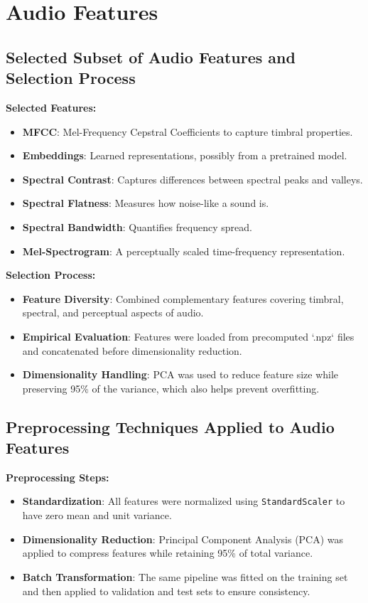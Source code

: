\documentclass{article}
\begin{document}

\section{Audio Features}

\subsection{Selected Subset of Audio Features and Selection Process}

\textbf{Selected Features:}
\begin{itemize}
    \item \textbf{MFCC}: Mel-Frequency Cepstral Coefficients to capture timbral properties.
    \item \textbf{Embeddings}: Learned representations, possibly from a pretrained model.
    \item \textbf{Spectral Contrast}: Captures differences between spectral peaks and valleys.
    \item \textbf{Spectral Flatness}: Measures how noise-like a sound is.
    \item \textbf{Spectral Bandwidth}: Quantifies frequency spread.
    \item \textbf{Mel-Spectrogram}: A perceptually scaled time-frequency representation.
\end{itemize}

\textbf{Selection Process:}
\begin{itemize}
    \item \textbf{Feature Diversity}: Combined complementary features covering timbral, spectral, and perceptual aspects of audio.
    \item \textbf{Empirical Evaluation}: Features were loaded from precomputed `.npz` files and concatenated before dimensionality reduction.
    \item \textbf{Dimensionality Handling}: PCA was used to reduce feature size while preserving 95\% of the variance, which also helps prevent overfitting.
\end{itemize}

\subsection{Preprocessing Techniques Applied to Audio Features}

\textbf{Preprocessing Steps:}
\begin{itemize}
    \item \textbf{Standardization}: All features were normalized using \texttt{StandardScaler} to have zero mean and unit variance.
    \item \textbf{Dimensionality Reduction}: Principal Component Analysis (PCA) was applied to compress features while retaining 95\% of total variance.
    \item \textbf{Batch Transformation}: The same pipeline was fitted on the training set and then applied to validation and test sets to ensure consistency.
\end{itemize}
\end{document}
